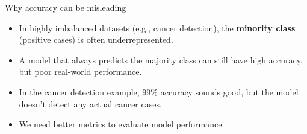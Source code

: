 \documentclass[serif, aspectratio=169]{beamer}
\begin{document}
\begin{frame}{Why accuracy can be misleading}
    \begin{itemize}
        \item In highly imbalanced datasets (e.g., cancer detection), the \textbf{minority class} (positive cases) is often underrepresented.
        \item A model that always predicts the majority class can still have high accuracy, but poor real-world performance.
        \item In the cancer detection example, 99\% accuracy sounds good, but the model doesn't detect any actual cancer cases.
        \item We need better metrics to evaluate model performance.
    \end{itemize}
\end{frame}
\end{document}
